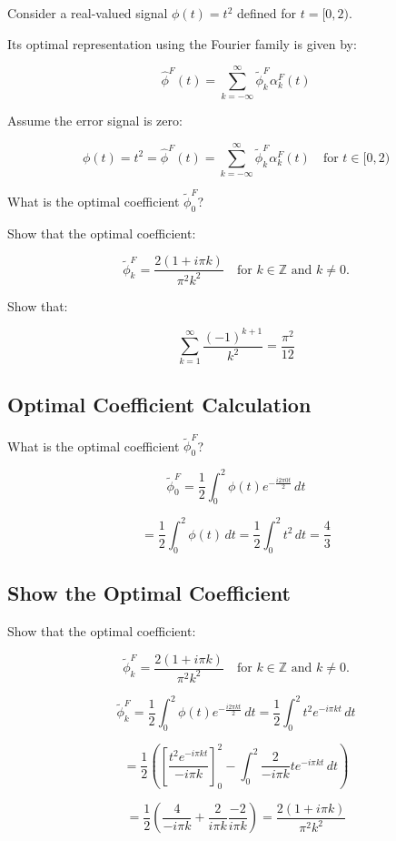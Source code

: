 \documentclass[12pt]{article}
\begin{document}
Consider a real-valued signal \( \phi(t) = t^2 \) defined for \( t = [0,2) \).

Its optimal representation using the Fourier family is given by:

\[
\hat{\phi}^F(t) = \sum_{k=-\infty}^{\infty} \tilde{\phi}_k^F \alpha_k^F(t)
\]

Assume the error signal is zero:

\[
\phi(t) = t^2 = \hat{\phi}^F(t) = \sum_{k=-\infty}^{\infty} \tilde{\phi}_k^F \alpha_k^F(t) \quad \text{for } t \in [0,2)
\]

What is the optimal coefficient \( \tilde{\phi}_0^F \)?

Show that the optimal coefficient:

\[
\tilde{\phi}_k^F = \frac{2(1 + i\pi k)}{\pi^2 k^2} \quad \text{for } k \in \mathbb{Z} \text{ and } k \neq 0.
\]

Show that:

\[
\sum_{k=1}^{\infty} \frac{(-1)^{k+1}}{k^2} = \frac{\pi^2}{12}
\]

\newpage

\subsection{Optimal Coefficient Calculation}

What is the optimal coefficient \( \tilde{\phi}_0^F \)?

\[
\tilde{\phi}_0^F = \frac{1}{2} \int_0^2 \phi(t) e^{-\frac{i2\pi 0 t}{2}} \, dt
\]

\[
= \frac{1}{2} \int_0^2 \phi(t) \, dt = \frac{1}{2} \int_0^2 t^2 \, dt = \frac{4}{3}
\]

\subsection{Show the Optimal Coefficient}

Show that the optimal coefficient:

\[
\tilde{\phi}_k^F = \frac{2(1 + i\pi k)}{\pi^2 k^2} \quad \text{for } k \in \mathbb{Z} \text{ and } k \neq 0.
\]

\[
\tilde{\phi}_k^F = \frac{1}{2} \int_0^2 \phi(t) e^{-\frac{i2\pi kt}{2}} \, dt = \frac{1}{2} \int_0^2 t^2 e^{-i\pi kt} \, dt
\]

\[
= \frac{1}{2} \left( \left[ \frac{t^2 e^{-i\pi kt}}{-i\pi k} \right]_0^2 - \int_0^2 \frac{2}{-i\pi k} t e^{-i\pi kt} \, dt \right)
\]

\[
= \frac{1}{2} \left( \frac{4}{-i\pi k} + \frac{2}{i\pi k} \frac{-2}{i\pi k} \right) = \frac{2(1 + i\pi k)}{\pi^2 k^2}
\]
\end{document}

